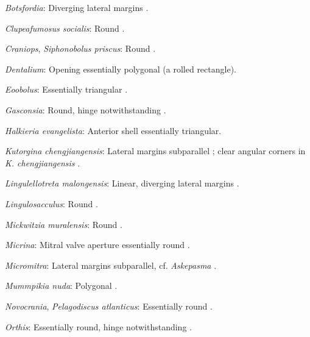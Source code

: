 \documentclass[openany]{book}
\begin{document}
\hypertarget{Botsfordia-coding-74}{}
\emph{Botsfordia}: Diverging lateral margins \citep{Li2004}.

\hypertarget{Clupeafumosus_socialis-coding-74}{}
\emph{Clupeafumosus socialis}: Round \citep{Topper2013Reappraisalof}.

\hypertarget{Craniops-coding-74}{}
\emph{Craniops}, \emph{Siphonobolus priscus}: Round
\citep{Williams2000LinguliformeaCraniiformea}.

\hypertarget{Dentalium-coding-74}{}
\emph{Dentalium}: Opening essentially polygonal (a rolled rectangle).

\hypertarget{Eoobolus-coding-74}{}
\emph{Eoobolus}: Essentially triangular
\citep{Williams2000LinguliformeaCraniiformea}.

\hypertarget{Gasconsia-coding-74}{}
\emph{Gasconsia}: Round, hinge notwithstanding
\citep{Hanken1985Thetaxonomy}.

\hypertarget{Halkieria_evangelista-coding-74}{}
\emph{Halkieria evangelista}: Anterior shell essentially triangular.

\hypertarget{Kutorgina_chengjiangensis-coding-74}{}
\emph{Kutorgina chengjiangensis}: Lateral margins subparallel
\citep[fig. 125]{Williams2000LinguliformeaCraniiformea}; clear angular
corners in \emph{K. chengjiangensis} \citep{Holmer2018Theattachment}.

\hypertarget{Lingulellotreta_malongensis-coding-74}{}
\emph{Lingulellotreta malongensis}: Linear, diverging lateral margins
\citep{Zhang2007Noteon}.

\hypertarget{Lingulosacculus-coding-74}{}
\emph{Lingulosacculus}: Round \citep{Balthasar2009EarlyCambrian}.

\hypertarget{Mickwitzia_muralensis-coding-74}{}
\emph{Mickwitzia muralensis}: Round \citep{Balthasar2004Shellstructure}.

\hypertarget{Micrina-coding-74}{}
\emph{Micrina}: Mitral valve aperture essentially round
\citep{Holmer2008TheEarly}.

\hypertarget{Micromitra-coding-74}{}
\emph{Micromitra}: Lateral margins subparallel, cf. \emph{Askepasma}
\citep{Robson2001Cambrianand}.

\hypertarget{Mummpikia_nuda-coding-74}{}
\emph{Mummpikia nuda}: Polygonal \citep{Balthasar2008iMummpikia}.

\hypertarget{Novocrania-coding-74}{}
\emph{Novocrania}, \emph{Pelagodiscus atlanticus}: Essentially round
\citep{Williams2000LinguliformeaCraniiformea}.

\hypertarget{Orthis-coding-74}{}
\emph{Orthis}: Essentially round, hinge notwithstanding \citep[fig.
523]{Williams2000LinguliformeaCraniiformea}.
\end{document}
